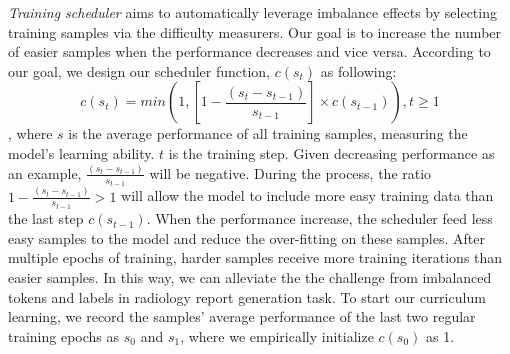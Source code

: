 \documentclass[sn-mathphys-num]{sn-jnl}%
\theoremstyle{thmstyleone}%
\theoremstyle{thmstyletwo}%
\theoremstyle{thmstylethree}%
\begin{document}
\textit{Training scheduler} aims to automatically leverage imbalance effects by selecting training samples via the difficulty measurers.
Our goal is to increase the number of easier samples when the performance decreases and vice versa. 
According to our goal, we design our scheduler function, $c(s_{t})$ as following: 
\begin{equation}\label{sampling}
    c(s_{t}) = min(1, [1-\frac{(s_{t}-s_{t-1})}{s_{t-1}}] \times c(s_{t-1})), t \geq 1
\end{equation},
where $s$ is the average performance of all training samples, measuring the model's learning ability. $t$ is the training step.
Given decreasing performance as an example, $\frac{(s_{t}-s_{t-1})}{s_{t-1}}$ will be negative.
During the process, the ratio $1-\frac{(s_{t}-s_{t-1})}{s_{t-1}} > 1$ will allow the model to include more easy training data than the last step $c(s_{t-1})$. 
When the performance increase, the scheduler feed less easy samples to the model and reduce the over-fitting on these samples.
After multiple epochs of training, harder samples  receive more training iterations than easier samples.
In this way, we can alleviate the the challenge from imbalanced tokens and labels in radiology report generation task.
To start our curriculum learning, we record the samples' average performance of the last two regular training epochs as $s_{0}$ and $s_{1}$, where we empirically initialize $c(s_{0})$ as 1.
\end{document}
